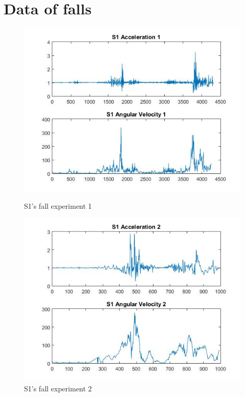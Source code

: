 \documentclass[letterpaper,12pt,titlepage,oneside,final]{book}
\begin{document}
\chapter{Data of falls}
\begin{figure}[h!]
	\centering
	\hspace{-1cm}
	\begin{minipage}[b]{0.5\textwidth}
		\centering
		\includegraphics[scale=0.42]{S1_1}
		\caption{S1's fall experiment 1}
	\end{minipage}%
	\hfill
	\begin{minipage}[b]{0.5\textwidth}
		\centering
		\includegraphics[scale=0.42]{S1_2}
		\caption{S1's fall experiment 2}
	\end{minipage}	
\end{figure}
\end{document}
